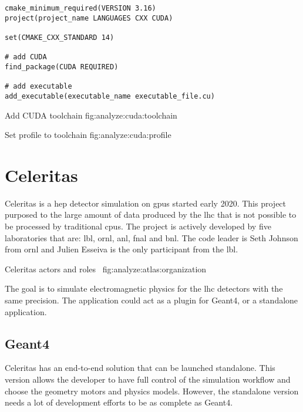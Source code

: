 \begin{code}
    \label{code:analyze:cuda:create_project}
    \begin{verbatim}
cmake_minimum_required(VERSION 3.16)
project(project_name LANGUAGES CXX CUDA)

set(CMAKE_CXX_STANDARD 14)

# add CUDA
find_package(CUDA REQUIRED)

# add executable
add_executable(executable_name executable_file.cu)
    \end{verbatim}
\end{code}

{Add CUDA toolchain}
{fig:analyze:cuda:toolchain}

{Set profile to toolchain}
{fig:analyze:cuda:profile}



\section{Celeritas}
\label{ch:analyze:atlas}

Celeritas is a \acrfull{hep} detector simulation on \acrshort{gpu}s started
early 2020.
This project purposed to the large amount of data produced by the
\acrfull{lhc} that is not possible to be processed by traditional
\acrshort{cpu}s.
The project is actively developed by five laboratories that are: \acrfull{lbl},
\acrfull{ornl}, \acrfull{anl}, \acrfull{fnal} and \acrfull{bnl}.
The code leader is Seth Johnson from \acrshort{ornl} and Julien Esseiva is the only
participant from the \acrshort{lbl}.

{Celeritas actors and roles~\cite{celeritas-presentation-johnson}}
{fig:analyze:atlas:organization}

The goal is to simulate electromagnetic physics for the \acrshort{lhc} detectors
with the same precision.
The application could act as a plugin for Geant4, or a standalone application.


\subsection{Geant4}
\label{ch:analyze:atlas:geant4}

Celeritas has an end-to-end solution that can be launched standalone.
This version allows the developer to have full control of the simulation
workflow and choose the geometry motors and physics models.
However, the standalone version needs a lot of development efforts to be as
complete as Geant4.

